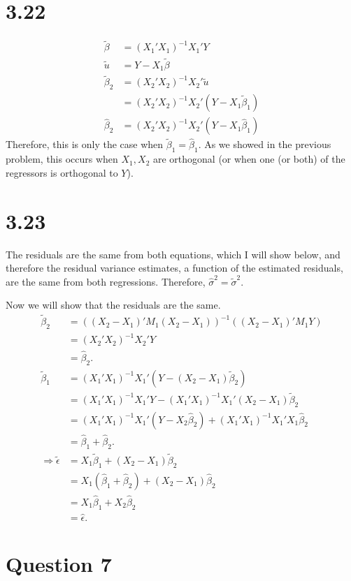 \documentclass[11pt]{article} %
\begin{document}
\section{3.22}
\begin{align*}
\tilde{\beta} &= (X_1'X_1)^{-1}X_1'Y\\
\tilde{u} &= Y -X_1\tilde{\beta}\\
\tilde{\beta}_2 &= (X_2'X_2)^{-1}X_2'\tilde{u}\\
&= (X_2'X_2)^{-1}X_2'(Y -X_1\tilde{\beta}_1)\\
\hat{\beta}_2 &= (X_2'X_2)^{-1}X_2'(Y -X_1\hat{\beta}_1)
\end{align*}
Therefore, this is only the case when $\tilde{\beta}_1=\hat{\beta}_1$. As we showed in the previous problem, this occurs when $X_1,X_2$ are orthogonal (or when one (or both) of the regressors is orthogonal to $Y$).
\section{3.23}
The residuals are the same from both equations, which I will show below, and therefore the residual variance estimates, a function of the estimated residuals, are the same from both regressions. Therefore, $\hat{\sigma}^2 = \tilde{\sigma}^2.$

Now we will show that the residuals are the same.
\begin{align*}
\tilde{\beta}_2 &= ((X_2-X_1)'M_1(X_2-X_1))^{-1} ((X_2 -X_1)'M_1Y)\\
&= (X_2'X_2)^{-1}X_2'Y \\
&= \hat{\beta}_2.\\
\tilde{\beta}_1 &= (X_1'X_1)^{-1}X_1' (Y-(X_2 - X_1)\tilde{\beta}_2) \\
&=  (X_1'X_1)^{-1}X_1'Y -  (X_1'X_1)^{-1}X_1' (X_2 - X_1)\tilde{\beta}_2\\
&= (X_1'X_1)^{-1}X_1'(Y - X_2\hat{\beta}_2) +  (X_1'X_1)^{-1}X_1'X_1\hat{\beta}_2\\
&= \hat{\beta}_1 + \hat{\beta}_2.\\
\Rightarrow \tilde{\epsilon} &= X_1\tilde{\beta}_1 + (X_2 - X_1)\tilde{\beta}_2\\
&= X_1(\hat{\beta}_1 + \hat{\beta}_2) +(X_2 - X_1)\hat{\beta}_2\\
&= X_1\hat{\beta}_1 + X_2 \hat{\beta}_2\\
&= \hat{\epsilon}.
\end{align*}

\section{Question 7}
\end{document}
